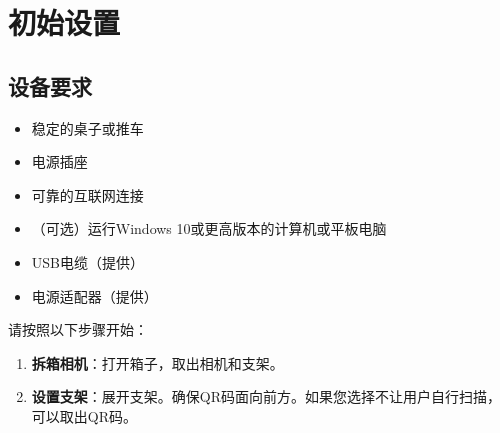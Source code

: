 \documentclass[
  Letterpaper,
]{scrbook}
\providecommand{\tightlist}{%
  \setlength{\itemsep}{0pt}\setlength{\parskip}{0pt}}\usepackage{longtable,booktabs,array}
\begin{document}
\section{初始设置}\label{ux521dux59cbux8bbeux7f6e}

\subsection{设备要求}\label{ux8bbeux5907ux8981ux6c42}

\begin{itemize}
\tightlist
\item
  稳定的桌子或推车
\item
  电源插座
\item
  可靠的互联网连接
\item
  （可选）运行Windows 10或更高版本的计算机或平板电脑
\item
  USB电缆（提供）
\item
  电源适配器（提供）
\end{itemize}

请按照以下步骤开始：

\begin{enumerate}
\def\labelenumi{\arabic{enumi}.}
\item
  \textbf{拆箱相机}：打开箱子，取出相机和支架。
\item
  \textbf{设置支架}：展开支架。确保QR码面向前方。如果您选择不让用户自行扫描，可以取出QR码。
\end{enumerate}
\end{document}
